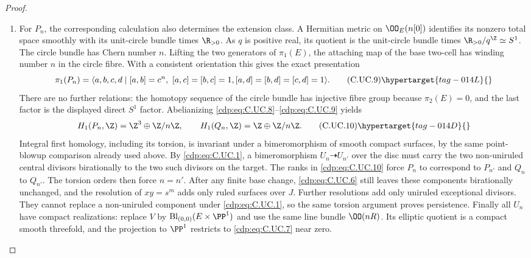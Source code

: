 \begin{proof}
\begin{enumerate}[label=\arabic*.,leftmargin=*]
\item For $P_n$, the corresponding calculation
also determines the extension class. A Hermitian
metric on $\OO_E(n[0])$ identifies its nonzero
total space smoothly with its unit-circle bundle
times $\R_{>0}$. As $q$ is positive real, its
quotient is the unit-circle bundle times
$\R_{>0}/q^{\Z}\simeq S^1$. The circle bundle
has Chern number $n$. Lifting the two generators
of $\pi_1(E)$, the attaching map of the base
two-cell has winding number $n$ in the circle
fibre. With a consistent orientation this gives
the exact presentation
\[
 \pi_1(P_n)=
 \langle a,b,c,d\mid
 [a,b]=c^n,\ [a,c]=[b,c]=1,
 [a,d]=[b,d]=[c,d]=1\rangle.
\tag{C.UC.9}\hypertarget{tag-014L}{}\label{cdp:eq:C.UC.9}
\]
There are no further relations: the homotopy
sequence of the circle bundle has injective
fibre group because $\pi_2(E)=0$, and the last
factor is the displayed direct $S^1$ factor.
Abelianizing \eqref{cdp:eq:C.UC.8}--\eqref{cdp:eq:C.UC.9} yields
\[
 H_1(P_n,\Z)=\Z^3\oplus\Z/n\Z,
 \qquad H_1(Q_n,\Z)=\Z\oplus\Z/n\Z.
\tag{C.UC.10}\hypertarget{tag-014D}{}\label{cdp:eq:C.UC.10}
\]
Integral first homology, including its torsion,
is invariant under a bimeromorphism of smooth
compact surfaces, by the same point-blowup
comparison already used above. By \eqref{cdp:eq:C.UC.1},
a bimeromorphism $U_n\dashrightarrow U_{n'}$
over the disc must carry the two non-uniruled
central divisors birationally to the two such
divisors on the target. The ranks in \eqref{cdp:eq:C.UC.10}
force $P_n$ to correspond to $P_{n'}$ and
$Q_n$ to $Q_{n'}$. The torsion orders then
force $n=n'$. After any finite base change,
\eqref{cdp:eq:C.UC.6} still leaves these components
birationally unchanged, and the resolution of
$xy=s^m$ adds only ruled surfaces over $J$.
Further resolutions add only uniruled
exceptional divisors. They cannot replace a
non-uniruled component under \eqref{cdp:eq:C.UC.1}, so
the same torsion argument proves persistence.
Finally all $U_n$ have compact realizations:
replace $V$ by
$\operatorname{Bl}_{(0,0)}(E\times\PP^1)$
and use the same line bundle $\OO(nR)$.
Its elliptic quotient is a compact smooth
threefold, and the projection to $\PP^1$
restricts to \eqref{cdp:eq:C.UC.7} near zero.

\end{enumerate}
\end{proof}
